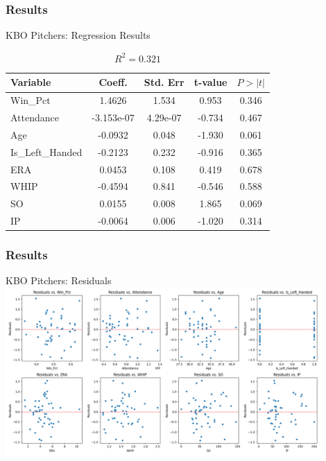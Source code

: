 \documentclass[9pt]{beamer}
\begin{document}
\begin{frame}
    \frametitle{Results}
    \begin{block}{KBO Pitchers: Regression Results}
        \begin{table}[ht]
            \centering
            \caption{\( R^2 = 0.321\)}
            \begin{tabular}{lcccc}
            \toprule
            Variable & Coeff. & Std. Err & t-value & $P > |t|$ \\
            \midrule
            Win\_Pct & 1.4626 & 1.534 & 0.953 & 0.346 \\
            Attendance & -3.153e-07 & 4.29e-07 & -0.734 & 0.467 \\
            \rowcolor{blue!20} Age & -0.0932 & 0.048 & -1.930 & 0.061 \\
            Is\_Left\_Handed & -0.2123 & 0.232 & -0.916 & 0.365 \\
            ERA & 0.0453 & 0.108 & 0.419 & 0.678 \\
            WHIP & -0.4594 & 0.841 & -0.546 & 0.588 \\
            \rowcolor{blue!20} SO & 0.0155 & 0.008 & 1.865 & 0.069 \\
            IP & -0.0064 & 0.006 & -1.020 & 0.314 \\
            \bottomrule
            \end{tabular}
        \end{table}               
    \end{block}
\end{frame}

\begin{frame}
    \frametitle{Results}
    \begin{block}{KBO Pitchers: Residuals}
        \centering
        \includegraphics[width=0.9\textwidth,keepaspectratio]{images/kbo_pitchers_residuals.png}
    \end{block}
\end{frame}
\end{document}
